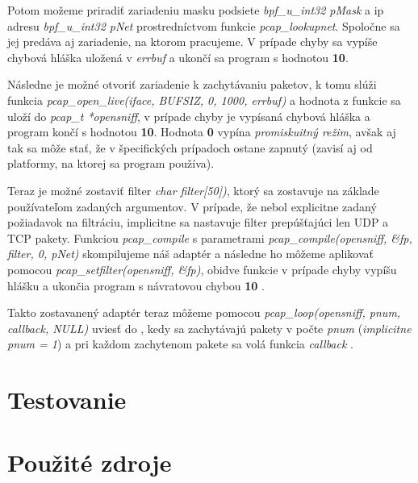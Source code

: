 \documentclass[11pt, a4paper]{article}
\begin{document}
	Potom možeme priradiť zariadeniu masku podsiete \emph{bpf\_u\_int32 pMask} a ip adresu  \emph{bpf\_u\_int32 pNet} prostredníctvom funkcie \emph{pcap\_lookupnet}. Spoločne sa jej predáva aj zariadenie, na ktorom pracujeme. V prípade chyby sa vypíše chybová hláška uložená v \emph{errbuf} a ukončí sa program s hodnotou \textbf{10}.
	
	Následne je možné otvoriť zariadenie k zachytávaniu paketov, k tomu slúži funkcia \emph{pcap\_open\_live(iface, BUFSIZ, 0, 1000, errbuf)} a hodnota z funkcie sa uloží do \emph{pcap\_t *opensniff}, v prípade chyby je vypísaná chybová hláška a program končí s hodnotou \textbf{10}. Hodnota \textbf{0} vypína \emph{promiskuitný režim}, avšak aj tak sa môže stať, že v špecifických prípadoch ostane zapnutý (zavisí aj od platformy, na ktorej sa program používa)\cite{WikiPromiscuity}.
	
	Teraz je možné zostaviť filter \emph{char filter[50])}, ktorý sa zostavuje na základe používateľom zadaných argumentov. V prípade, že nebol explicitne zadaný požiadavok na filtráciu, implicitne sa nastavuje filter prepúšťajúci len UDP a TCP pakety. Funkciou \emph{pcap\_compile} s parametrami \emph{pcap\_compile(opensniff, \&fp, filter, 0, pNet)} skompilujeme náš adaptér a následne ho môžeme aplikovať pomocou \emph{pcap\_setfilter(opensniff, \&fp)}, obidve funkcie v prípade chyby vypíšu hlášku a ukončia program s návratovou chybou \textbf{10} \cite{Tcpdump}. 
	
	Takto zostavanený adaptér teraz môžeme pomocou \emph{pcap\_loop(opensniff, pnum, callback, NULL)} uviesť do , kedy sa zachytávajú pakety v počte \emph{pnum} (\textit{implicitne pnum = 1}) a pri každom zachytenom pakete sa volá funkcia \emph{callback} \cite{Geeksniffer}.
	
	
	\section{Testovanie}
	
	
	\newpage
	\section{Použité zdroje}
	
	
	\renewcommand{\refname}{Použitá literatúra}
	
	
	
\end{document}
